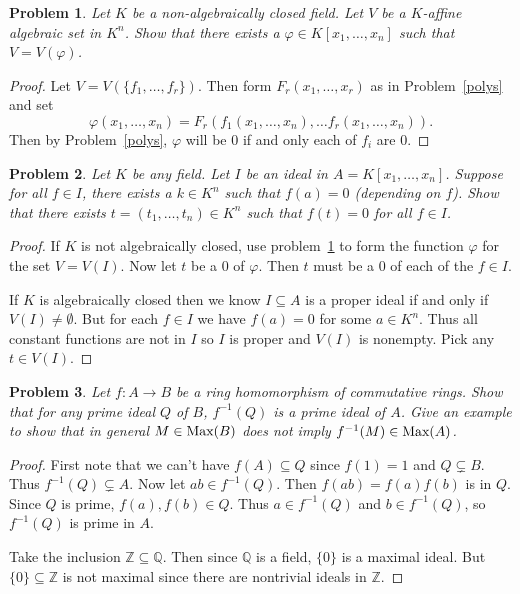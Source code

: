 \documentclass{article}
\newcommand{\Max}{\textup{Max}}
\newtheorem{problem}{Problem}
\begin{document}
\begin{problem}
\label{phi}
Let $K$ be a non-algebraically closed field. Let $V$ be a $K$-affine algebraic set in $K^n$. Show that there exists a $\varphi \in K[x_1, \dots , x_n]$ such that $V = V(\varphi)$.
\end{problem}
\begin{proof}
Let $V = V(\{f_1, \dots , f_r\})$. Then form $F_r(x_1, \dots , x_r)$ as in Problem~\ref{polys} and set
\[
\varphi(x_1, \dots , x_n) = F_r(f_1(x_1, \dots , x_n), \dots f_r(x_1, \dots , x_n)).
\]
Then by Problem~\ref{polys}, $\varphi$ will be $0$ if and only each of $f_i$ are $0$.
\end{proof}

\begin{problem}
Let $K$ be any field. Let $I$ be an ideal in $A = K[x_1, \dots , x_n]$. Suppose for all $f \in I$, there exists a $k \in K^n$ such that $f(a) = 0$ (depending on $f$). Show that there exists $t = (t_1, \dots , t_n) \in K^n$ such that $f(t) = 0$ for all $f \in I$.
\end{problem}
\begin{proof}
If $K$ is not algebraically closed, use problem~\ref{phi} to form the function $\varphi$ for the set $V = V(I)$. Now let $t$ be a $0$ of $\varphi$. Then $t$ must be a $0$ of each of the $f \in I$.

If $K$ is algebraically closed then we know $I \subseteq A$ is a proper ideal if and only if $V(I) \neq \emptyset$. But for each $f \in I$ we have $f(a) = 0$ for some $a \in K^n$. Thus all constant functions are not in $I$ so $I$ is proper and $V(I)$ is nonempty. Pick any $t \in V(I)$.
\end{proof}

\begin{problem}
Let $f : A \to B$ be a ring homomorphism of commutative rings. Show that for any prime ideal $Q$ of $B$, $f^{-1}(Q)$ is a prime ideal of $A$. Give an example to show that in general $M \in \Max(B)$ does \emph{not} imply $f^{-1}(M) \in \Max(A)$.
\end{problem}
\begin{proof}
First note that we can't have $f(A) \subseteq Q$ since $f(1) = 1$ and $Q \subsetneq B$. Thus $f^{-1}(Q) \subsetneq A$. Now let $ab \in f^{-1}(Q)$. Then $f(ab) = f(a)f(b)$ is in $Q$. Since $Q$ is prime, $f(a), f(b) \in Q$. Thus $a \in f^{-1}(Q)$ and $b \in f^{-1}(Q)$, so $f^{-1}(Q)$ is prime in $A$.

Take the inclusion $\mathbb{Z} \subseteq \mathbb{Q}$. Then since $\mathbb{Q}$ is a field, $\{0\}$ is a maximal ideal. But $\{0\} \subseteq \mathbb{Z}$ is not maximal since there are nontrivial ideals in $\mathbb{Z}$.
\end{proof}
\end{document}
